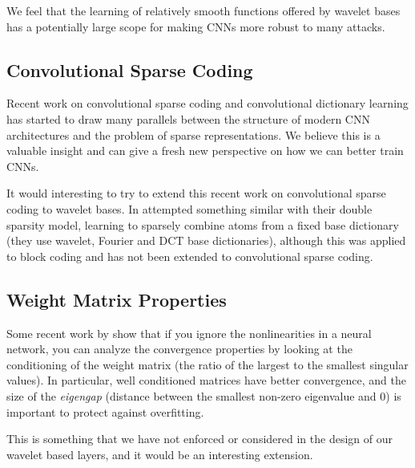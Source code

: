 We feel that the learning of relatively smooth functions offered by wavelet bases has a potentially
large scope for making CNNs more robust to many attacks.

\subsection{Convolutional Sparse Coding}
Recent work on convolutional sparse coding and convolutional
dictionary learning \cite{liu_online_2017, liu_first_2018,
papyan_convolutional_2017-1, papyan_convolutional_2017, papyan_theoretical_2018}
has started to draw many parallels between the
structure of modern CNN architectures and the problem of sparse
representations. We believe this is a valuable insight and can give a fresh new
perspective on how we can better train CNNs.

It would interesting to try to extend this recent work on
convolutional sparse coding to wavelet bases. In \cite{rubinstein_double_2010}
\citeauthor{rubinstein_double_2010} attempted something similar with their
double sparsity model, learning to sparsely combine atoms from a fixed base
dictionary (they use wavelet, Fourier and DCT base dictionaries), although this
was applied to block coding and has not been extended to convolutional sparse coding.

\subsection{Weight Matrix Properties}
Some recent work by \citeauthor{advani_high-dimensional_2017}
\cite{advani_high-dimensional_2017} show that if you ignore the
nonlinearities in a neural network, you can analyze the convergence properties
by looking at the conditioning of the weight matrix (the ratio of the largest to
the smallest singular values). In particular, well conditioned matrices have
better convergence, and the size of the \emph{eigengap} (distance between the
smallest non-zero eigenvalue and 0) is important to protect against overfitting.

This is something that we have not enforced or considered in the design of our
wavelet based layers, and it would be an interesting extension.

